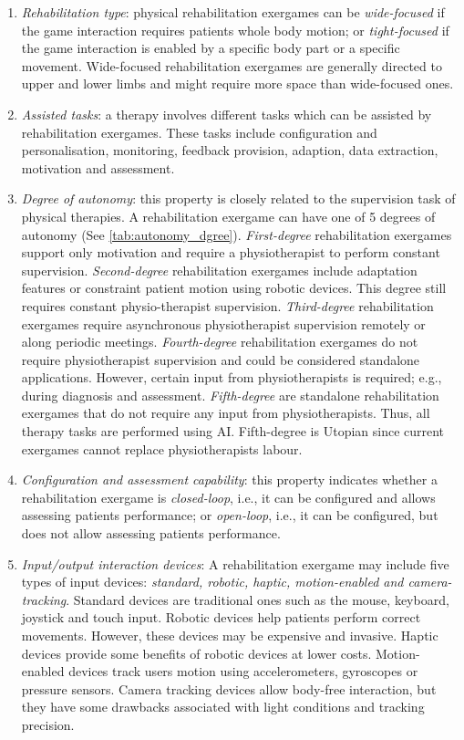\begin{enumerate}
    \item \emph{Rehabilitation type}: physical rehabilitation exergames can be \textit{wide-focused} if the game interaction requires patients whole body motion; or \textit{tight-focused} if the game interaction is enabled by a specific body part or a specific movement. Wide-focused rehabilitation exergames are generally directed to upper and lower limbs and might require more space than wide-focused ones.
    
    \item \emph{Assisted tasks}: a therapy involves different tasks which can be assisted by rehabilitation exergames. These tasks include configuration and personalisation, monitoring, feedback provision, adaption, data extraction, motivation and assessment.
    
    \item \emph{Degree of autonomy}: this property is closely related to the supervision task of physical therapies. A rehabilitation exergame can have one of 5 degrees of autonomy (See \autoref{tab:autonomy_dgree}). \textit{First-degree} rehabilitation exergames support only motivation and require a physiotherapist to perform constant supervision. \textit{Second-degree} rehabilitation exergames include adaptation features or constraint patient motion using robotic devices. This degree still requires constant physio-therapist supervision. \textit{Third-degree} rehabilitation exergames require asynchronous physiotherapist supervision remotely or along periodic meetings. \textit{Fourth-degree} rehabilitation exergames do not require physiotherapist supervision and could be considered standalone applications. However, certain input from physiotherapists is required; e.g., during diagnosis and assessment. \textit{Fifth-degree} are standalone rehabilitation exergames that do not require any input from physiotherapists. Thus, all therapy tasks are performed using \ac{AI}. Fifth-degree is Utopian since current exergames cannot replace physiotherapists labour.
    
    \item \emph{Configuration and assessment capability}: this property indicates whether a rehabilitation exergame is \textit{closed-loop}, i.e., it can be configured and allows assessing patients performance; or \textit{open-loop}, i.e., it can be configured, but does not allow assessing patients performance.
    
    \item \emph{Input/output interaction devices}: A rehabilitation exergame may include five types of input devices: \textit{standard, robotic, haptic, motion-enabled and camera-tracking}. Standard devices are traditional ones such as the mouse, keyboard, joystick and touch input. Robotic devices help patients perform correct movements. However, these devices may be expensive and invasive. Haptic devices provide some benefits of robotic devices at lower costs. Motion-enabled devices track users motion using accelerometers, gyroscopes or pressure sensors. Camera tracking devices allow body-free interaction, but they have some drawbacks associated with light conditions and tracking precision.
    

\end{enumerate}
